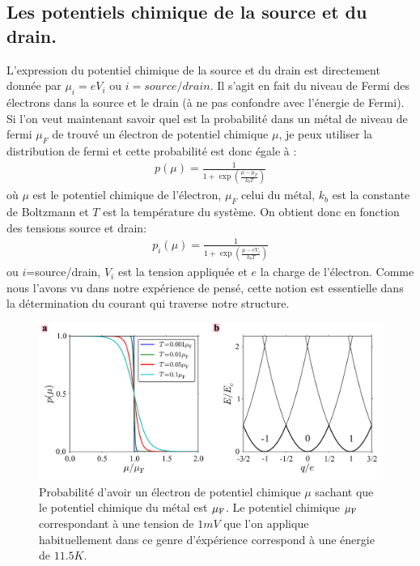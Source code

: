 \subsection{Les potentiels chimique de la source et du drain.}
L'expression du potentiel chimique de la source et du drain est directement donnée par $\mu_i = e V_i$ ou $i=source/drain$. Il s'agit en fait du niveau de Fermi des électrons dans la source et le drain (à ne pas confondre avec l'énergie de Fermi). Si l'on veut maintenant savoir quel est la probabilité dans un métal de niveau de fermi $\mu_F$ de trouvé un électron de potentiel chimique $\mu$, je peux utiliser la distribution de fermi et cette probabilité est donc égale à :
\begin{eqnarray}
p(\mu) = \frac{1}{1 + \exp{(\frac{\mu - \mu_F}{k_bT})}} \nonumber
\end{eqnarray}
où $\mu$ est le potentiel chimique de l'électron, $\mu_F$ celui du métal, $k_b$ est la constante de Boltzmann et $T$ est la température du système. On obtient donc en fonction des tensions source et drain:
\begin{eqnarray}
p_i(\mu) = \frac{1}{1 + \exp{(\frac{\mu - eV_i}{k_bT})}}
\end{eqnarray}
ou $i$=source/drain, $V_i$ est la tension appliquée et $e$ la charge de l'électron. Comme nous l'avons vu dans notre expérience de pensé, cette notion est essentielle dans la détermination du courant qui traverse notre structure.

\begin{figure}
\centering \includegraphics[scale=0.5]{Theorie/Transport/figure2/figure2.pdf} 
\caption{Probabilité d'avoir un électron de potentiel chimique $\mu$ sachant que le potentiel chimique du métal est $\mu_{\rm{F}}$. Le potentiel chimique $\mu_{\rm{F}}$ correspondant à une tension de $1mV$ que l'on applique habituellement dans ce genre d'éxpérience correspond à une énergie de $11.5K$.}
\label{distrib_fermi}
\end{figure}



